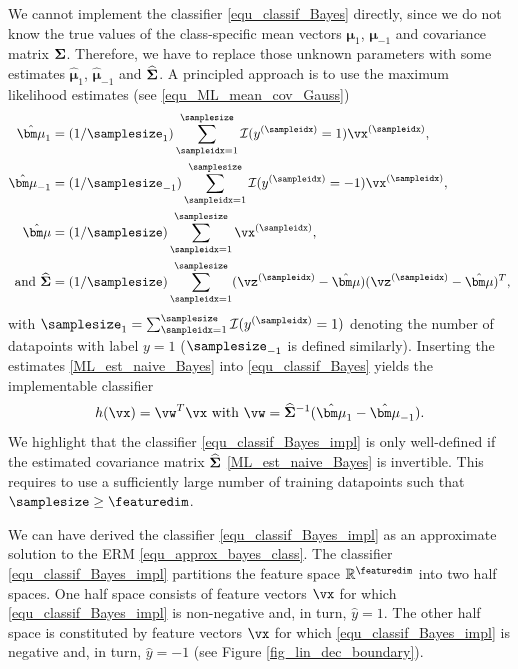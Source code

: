 \documentclass[12pt]{report}
\begin{document}
We cannot implement the classifier \eqref{equ_classif_Bayes} directly, since we do not know the 
true values of the class-specific mean vectors ${\bm \mu}_{1}$, ${\bm \mu}_{-1}$ and covariance 
matrix ${\bf \Sigma}$. Therefore, we have to replace those unknown parameters with some 
estimates $\hat{\bm \mu}_{1}$, $\hat{\bm \mu}_{-1}$ and $\widehat{\bf \Sigma}$. A principled 
approach is to use the maximum likelihood estimates (see \eqref{equ_ML_mean_cov_Gauss}) 
\begin{align}
\hat{\bm \mu}_{1}  & = (1/\samplesize_{1}) \sum_{\sampleidx=1}^{\samplesize} \mathcal{I}(y^{(\sampleidx)}=1) \vx^{(\sampleidx)}, \nonumber \\
\hat{\bm \mu}_{-1}  & = (1/\samplesize_{-1}) \sum_{\sampleidx=1}^{\samplesize} \mathcal{I}(y^{(\sampleidx)}=-1) \vx^{(\sampleidx)}, \nonumber \\
\hat{\bm \mu} & =  (1/\samplesize) \sum_{\sampleidx=1}^{\samplesize} \vx^{(\sampleidx)}, \nonumber \\
 \mbox{and } \widehat{\bf \Sigma} & = (1/\samplesize) \sum_{\sampleidx=1}^{\samplesize} (\vz^{(\sampleidx)} - \hat{\bm \mu})(\vz^{(\sampleidx)} - \hat{\bm \mu})^{T}, \label{ML_est_naive_Bayes}
\end{align}
with $\samplesize_{1} = \sum_{\sampleidx=1}^{\samplesize}  \mathcal{I}(y^{(\sampleidx)}=1)$ 
denoting the number of datapoints with label $y=1$ ($\samplesize_{-1}$ is defined similarly). 
Inserting the estimates \eqref{ML_est_naive_Bayes} into \eqref{equ_classif_Bayes} yields the 
implementable classifier 
\begin{equation}
\label{equ_classif_Bayes_impl}
h(\vx) = \vw^{T} \vx \mbox{ with } \vw =  \widehat{\bf \Sigma}^{-1} (\hat{\bm \mu}_{1} - \hat{\bm \mu}_{-1}). 
\end{equation} 
We highlight that the classifier \eqref{equ_classif_Bayes_impl} is only well-defined if the estimated 
covariance matrix $\widehat{\bf \Sigma}$ \eqref{ML_est_naive_Bayes} is invertible. This requires 
to use a sufficiently large number of training datapoints such that $\samplesize \geq \featuredim$. 

We can have derived the classifier \eqref{equ_classif_Bayes_impl} as an approximate solution 
to the ERM \eqref{equ_approx_bayes_class}. The classifier \eqref{equ_classif_Bayes_impl} partitions 
the feature space $\mathbb{R}^{\featuredim}$ into two half spaces. One half space 
consists of feature vectors $\vx$ for which \eqref{equ_classif_Bayes_impl} is non-negative and, 
in turn, $\hat{y}=1$. The other half space is constituted by feature vectors $\vx$ for which 
\eqref{equ_classif_Bayes_impl} is negative and, in turn, $\hat{y}=-1$ (see Figure \ref{fig_lin_dec_boundary}). 
\end{document}
